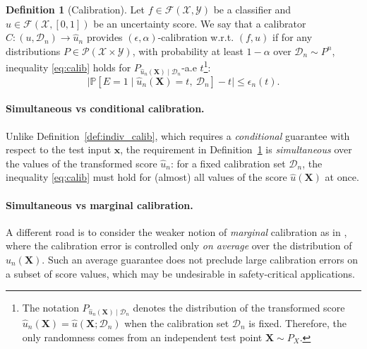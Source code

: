 \documentclass{article}
\theoremstyle{plain}
\theoremstyle{definition}
\newtheorem{definition}[theorem]{Definition}
\theoremstyle{remark}
\begin{document}
\begin{definition}[Calibration]
\label{def:calibration}
Let $f\in\mathcal F(\mathcal X,\mathcal Y)$ be a classifier and $u \in \mathcal{F}(\mathcal{X}, [0,1])$ be an uncertainty score. We say that a calibrator $C: (u,  \mathcal{D}_n)\to \widehat{u}_n$ provides $(\epsilon,\alpha)$-calibration w.r.t. $(f,u)$ if for any distributions
$P\in\mathcal P(\mathcal X\times\mathcal Y)$,
with probability at least $1-\alpha$ over $\mathcal D_n\sim P^n$, inequality \eqref{eq:calib} holds for $P_{\widehat u_n(\mathbf X)\mid \mathcal D_n}$-a.e $t$\footnote{The notation $P_{\widehat u_n(\mathbf X)\mid \mathcal D_n}$ denotes the distribution of the transformed score $ \widehat{u}_n(\mathbf{X})= \widehat u(\mathbf X; \mathcal{D}_n)$ when the calibration set $\mathcal{D}_n$ is fixed. Therefore, the only randomness comes from an independent test point $\mathbf{X} \sim P_X$.}:
\begin{equation}
\label{eq:calib}
\big|\mathbb P[E=1\mid \widehat{u}_n (\mathbf{X})=t,\ \mathcal D_n] - t\big|
\le \epsilon_n(t).
\end{equation}

\paragraph{Simultaneous vs conditional calibration.}
Unlike Definition~\ref{def:indiv_calib}, which requires a \textit{conditional} guarantee with respect to the test input $\mathbf{x}$, the requirement in Definition~\ref{def:calibration} is \emph{simultaneous} over the values of the transformed score $\widehat{u}_n$: for a fixed calibration set $\mathcal D_n$, the inequality \eqref{eq:calib} must hold for (almost) all values of the score $\widehat u(\mathbf X)$ at once.  


\paragraph{Simultaneous vs marginal calibration.}
A different road is to consider the weaker notion of \textit{marginal} calibration as in \citep{gupta_distribution-free_2021, gupta2022distributionfreebinaryclassificationprediction}, where the calibration error is controlled only \textit{on average} over the distribution of $\widehat u_n(\mathbf X)$. Such an average guarantee does not preclude large calibration errors on a subset of score values, which may be undesirable in safety-critical applications.
 


\end{definition}
\end{document}
